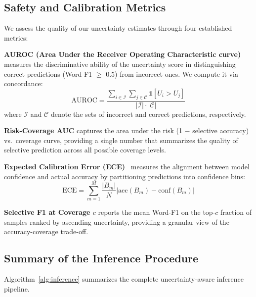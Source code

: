 \documentclass[pdflatex,sn-mathphys-num]{sn-jnl}
\begin{document}
\subsection{Safety and Calibration Metrics}\label{subsec:safety_metrics}

We assess the quality of our uncertainty estimates through four established metrics:

\textbf{AUROC (Area Under the Receiver Operating Characteristic curve)} measures the discriminative ability of the uncertainty score in distinguishing correct predictions (Word-F1 $\geq$ 0.5) from incorrect ones. We compute it via concordance:
\begin{equation}
    \text{AUROC} = \frac{\sum_{i \in \mathcal{I}} \sum_{j \in \mathcal{C}} \mathbb{1}[U_i > U_j]}{|\mathcal{I}| \cdot |\mathcal{C}|}
\end{equation}
where $\mathcal{I}$ and $\mathcal{C}$ denote the sets of incorrect and correct predictions, respectively.

\textbf{Risk-Coverage AUC} captures the area under the risk (1 $-$ selective accuracy) vs.\ coverage curve, providing a single number that summarizes the quality of selective prediction across all possible coverage levels.

\textbf{Expected Calibration Error (ECE)}~\cite{naeini2015ece} measures the alignment between model confidence and actual accuracy by partitioning predictions into confidence bins:
\begin{equation}
    \text{ECE} = \sum_{m=1}^{M} \frac{|B_m|}{N} \left| \text{acc}(B_m) - \text{conf}(B_m) \right|
\end{equation}

\textbf{Selective F1 at Coverage $c$} reports the mean Word-F1 on the top-$c$ fraction of samples ranked by ascending uncertainty, providing a granular view of the accuracy-coverage trade-off.

\subsection{Summary of the Inference Procedure}

Algorithm~\ref{alg:inference} summarizes the complete uncertainty-aware inference pipeline.
\end{document}
